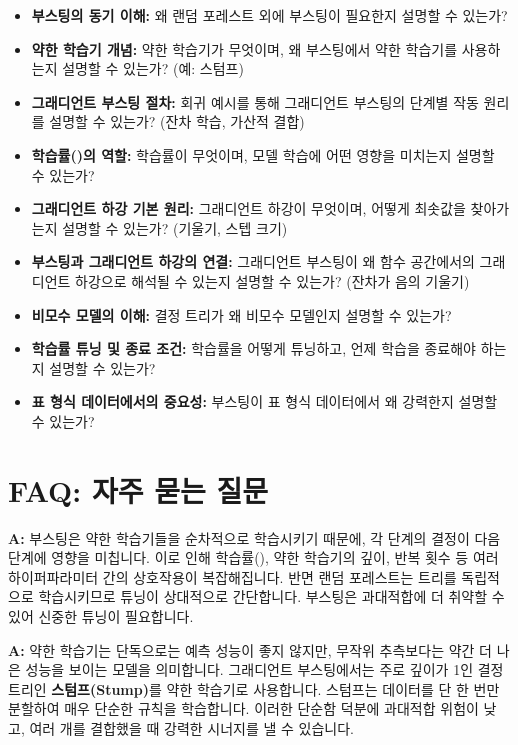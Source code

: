 \documentclass[11pt,a4paper]{article}
\theoremstyle{definition}
\begin{document}
\begin{itemize}
    \item \textbf{부스팅의 동기 이해:} 왜 랜덤 포레스트 외에 부스팅이 필요한지 설명할 수 있는가?
    \item \textbf{약한 학습기 개념:} 약한 학습기가 무엇이며, 왜 부스팅에서 약한 학습기를 사용하는지 설명할 수 있는가? (예: 스텀프)
    \item \textbf{그래디언트 부스팅 절차:} 회귀 예시를 통해 그래디언트 부스팅의 단계별 작동 원리를 설명할 수 있는가? (잔차 학습, 가산적 결합)
    \item \textbf{학습률(\texttt{\lambda})의 역할:} 학습률이 무엇이며, 모델 학습에 어떤 영향을 미치는지 설명할 수 있는가?
    \item \textbf{그래디언트 하강 기본 원리:} 그래디언트 하강이 무엇이며, 어떻게 최솟값을 찾아가는지 설명할 수 있는가? (기울기, 스텝 크기)
    \item \textbf{부스팅과 그래디언트 하강의 연결:} 그래디언트 부스팅이 왜 함수 공간에서의 그래디언트 하강으로 해석될 수 있는지 설명할 수 있는가? (잔차가 음의 기울기)
    \item \textbf{비모수 모델의 이해:} 결정 트리가 왜 비모수 모델인지 설명할 수 있는가?
    \item \textbf{학습률 튜닝 및 종료 조건:} 학습률을 어떻게 튜닝하고, 언제 학습을 종료해야 하는지 설명할 수 있는가?
    \item \textbf{표 형식 데이터에서의 중요성:} 부스팅이 표 형식 데이터에서 왜 강력한지 설명할 수 있는가?
\end{itemize}

\newpage
\section{FAQ: 자주 묻는 질문}

\begin{faqbox}[title=\textbf{Q: 왜 부스팅이 랜덤 포레스트보다 튜닝하기 어려운가요?}] %
\textbf{A:} 부스팅은 약한 학습기들을 순차적으로 학습시키기 때문에, 각 단계의 결정이 다음 단계에 영향을 미칩니다. 이로 인해 학습률(\texttt{\lambda}), 약한 학습기의 깊이, 반복 횟수 등 여러 하이퍼파라미터 간의 상호작용이 복잡해집니다. 반면 랜덤 포레스트는 트리를 독립적으로 학습시키므로 튜닝이 상대적으로 간단합니다. 부스팅은 과대적합에 더 취약할 수 있어 신중한 튜닝이 필요합니다.
\end{faqbox}

\begin{faqbox}[title=\textbf{Q: 약한 학습기(Weak Learner)란 정확히 무엇인가요?}] %
\textbf{A:} 약한 학습기는 단독으로는 예측 성능이 좋지 않지만, 무작위 추측보다는 약간 더 나은 성능을 보이는 모델을 의미합니다. 그래디언트 부스팅에서는 주로 깊이가 1인 결정 트리인 \textbf{스텀프(Stump)}를 약한 학습기로 사용합니다. 스텀프는 데이터를 단 한 번만 분할하여 매우 단순한 규칙을 학습합니다. 이러한 단순함 덕분에 과대적합 위험이 낮고, 여러 개를 결합했을 때 강력한 시너지를 낼 수 있습니다.
\end{faqbox}
\end{document}
